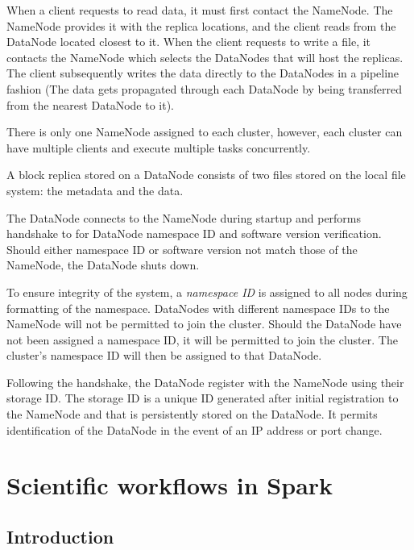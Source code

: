 \documentclass{report}
\begin{document}
        When a client requests to read data, it must first contact 
        the NameNode. The NameNode provides it with the replica 
        locations, and the client reads from the DataNode located 
        closest to it. When the client requests to write a file, it
        contacts the NameNode which selects the DataNodes that will 
        host the replicas. The client subsequently writes the data 
        directly to the DataNodes in a pipeline fashion (The data 
        gets propagated through each DataNode by being transferred
        from the nearest DataNode to it).

        There is only one NameNode assigned to each cluster, however, 
        each cluster can have multiple clients and execute multiple 
        tasks concurrently.


        A block replica stored on a DataNode consists of two files 
        stored on the local file system: the metadata and the data. 

        The DataNode connects to the NameNode during startup and 
        performs handshake to for DataNode namespace ID and 
        software version verification. Should either namespace ID 
        or software version not match those of the NameNode, the 
        DataNode shuts down.

        To ensure integrity of the system, a \textit{namespace ID} 
        is assigned to all nodes during formatting of the namespace. 
        DataNodes with different namespace IDs to the NameNode will 
        not be permitted to join the cluster. Should the DataNode
        have not been assigned a namespace ID, it will be permitted 
        to join the cluster. The cluster's namespace ID will then be 
        assigned to that DataNode.


        Following the handshake, the DataNode register with the 
        NameNode using their storage ID. The storage ID is a unique 
        ID generated after initial registration to the NameNode and 
        that is persistently stored on the DataNode. It permits
        identification of the DataNode in the event of an IP address 
        or port change. 
        
\chapter{Scientific workflows in Spark}
    \section{Introduction} 
\end{document}
